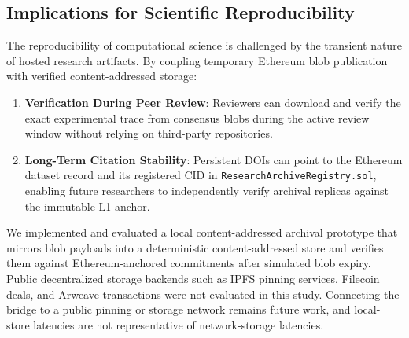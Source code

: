 \subsection{Implications for Scientific Reproducibility}
The reproducibility of computational science is challenged by the transient nature of hosted research artifacts. By coupling temporary Ethereum blob publication with verified content-addressed storage:
\begin{enumerate}
    \item \textbf{Verification During Peer Review}: Reviewers can download and verify the exact experimental trace from consensus blobs during the active review window without relying on third-party repositories.
    \item \textbf{Long-Term Citation Stability}: Persistent DOIs can point to the Ethereum dataset record and its registered CID in \texttt{ResearchArchiveRegistry.sol}, enabling future researchers to independently verify archival replicas against the immutable L1 anchor.
\end{enumerate}

We implemented and evaluated a local content-addressed archival prototype that mirrors blob payloads into a deterministic content-addressed store and verifies them against Ethereum-anchored commitments after simulated blob expiry. Public decentralized storage backends such as IPFS pinning services, Filecoin deals, and Arweave transactions were not evaluated in this study. Connecting the bridge to a public pinning or storage network remains future work, and local-store latencies are not representative of network-storage latencies.
